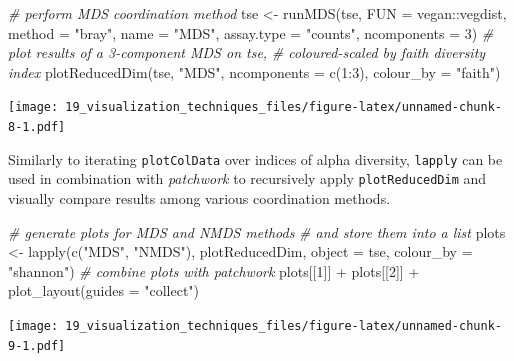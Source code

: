 \documentclass[
]{book}
\newenvironment{Shaded}{\begin{snugshade}}{\end{snugshade}}
\newcommand{\AttributeTok}[1]{\textcolor[rgb]{0.77,0.63,0.00}{#1}}
\newcommand{\CommentTok}[1]{\textcolor[rgb]{0.56,0.35,0.01}{\textit{#1}}}
\newcommand{\DecValTok}[1]{\textcolor[rgb]{0.00,0.00,0.81}{#1}}
\newcommand{\FunctionTok}[1]{\textcolor[rgb]{0.00,0.00,0.00}{#1}}
\newcommand{\NormalTok}[1]{#1}
\newcommand{\OtherTok}[1]{\textcolor[rgb]{0.56,0.35,0.01}{#1}}
\newcommand{\SpecialCharTok}[1]{\textcolor[rgb]{0.00,0.00,0.00}{#1}}
\newcommand{\StringTok}[1]{\textcolor[rgb]{0.31,0.60,0.02}{#1}}
\begin{document}
\begin{Shaded}
\begin{Highlighting}[]
\CommentTok{\# perform MDS coordination method}
\NormalTok{tse }\OtherTok{\textless{}{-}} \FunctionTok{runMDS}\NormalTok{(tse,}
              \AttributeTok{FUN =}\NormalTok{ vegan}\SpecialCharTok{::}\NormalTok{vegdist,}
              \AttributeTok{method =} \StringTok{"bray"}\NormalTok{,}
              \AttributeTok{name =} \StringTok{"MDS"}\NormalTok{,}
              \AttributeTok{assay.type =} \StringTok{"counts"}\NormalTok{,}
              \AttributeTok{ncomponents =} \DecValTok{3}\NormalTok{)}
\CommentTok{\# plot results of a 3{-}component MDS on tse,}
\CommentTok{\# coloured{-}scaled by faith diversity index}
\FunctionTok{plotReducedDim}\NormalTok{(tse, }\StringTok{"MDS"}\NormalTok{, }\AttributeTok{ncomponents =} \FunctionTok{c}\NormalTok{(}\DecValTok{1}\SpecialCharTok{:}\DecValTok{3}\NormalTok{), }\AttributeTok{colour\_by =} \StringTok{"faith"}\NormalTok{)}
\end{Highlighting}
\end{Shaded}

\texttt{[image: 19\_visualization\_techniques\_files/figure-latex/unnamed-chunk-8-1.pdf]}

Similarly to iterating \texttt{plotColData} over indices of alpha diversity,
\texttt{lapply} can be used in combination with \emph{patchwork} to recursively
apply \texttt{plotReducedDim} and visually compare results among various
coordination methods.

\begin{Shaded}
\begin{Highlighting}[]
\CommentTok{\# generate plots for MDS and NMDS methods}
\CommentTok{\# and store them into a list}
\NormalTok{plots }\OtherTok{\textless{}{-}} \FunctionTok{lapply}\NormalTok{(}\FunctionTok{c}\NormalTok{(}\StringTok{"MDS"}\NormalTok{, }\StringTok{"NMDS"}\NormalTok{),}
\NormalTok{                plotReducedDim,}
                \AttributeTok{object =}\NormalTok{ tse,}
                \AttributeTok{colour\_by =} \StringTok{"shannon"}\NormalTok{)}
\CommentTok{\# combine plots with patchwork}
\NormalTok{plots[[}\DecValTok{1}\NormalTok{]] }\SpecialCharTok{+}\NormalTok{ plots[[}\DecValTok{2}\NormalTok{]] }\SpecialCharTok{+}
  \FunctionTok{plot\_layout}\NormalTok{(}\AttributeTok{guides =} \StringTok{"collect"}\NormalTok{)}
\end{Highlighting}
\end{Shaded}

\texttt{[image: 19\_visualization\_techniques\_files/figure-latex/unnamed-chunk-9-1.pdf]}
\end{document}
